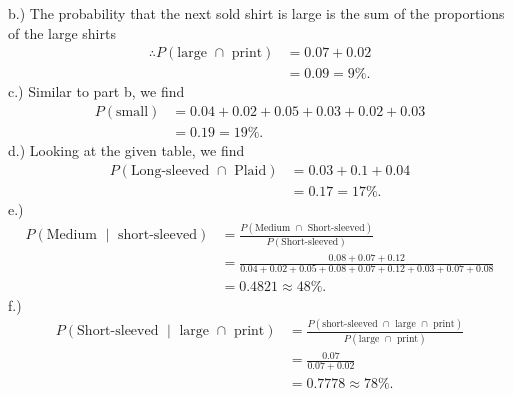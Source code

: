 \documentclass{report}
\begin{document}
    \bigbreak \noindent 
    b.) The probability that the next sold shirt is large is the sum of the proportions of the large shirts
    \begin{align*}
        \therefore P(\text{large } \cap \text{ print}) &= 0.07 + 0.02 \\
        &=0.09 = 9\%
    .\end{align*}
    \bigbreak \noindent 
    c.) Similar to part b, we find
    \begin{align*}
        P(\text{small}) &= 0.04 + 0.02 + 0.05 + 0.03 + 0.02 + 0.03 \\
                        &=0.19 = 19\%
    .\end{align*}
    \bigbreak \noindent 
    d.) Looking at the given table, we find
    \begin{align*}
        P(\text{Long-sleeved } \cap \text{ Plaid}) &= 0.03 + 0.1 + 0.04 \\
        &=0.17 = 17\%
    .\end{align*}
    \bigbreak \noindent 
    e.) 
    \begin{align*}
        P(\text{Medium } \mid \text{ short-sleeved}) &= \frac{P(\text{Medium } \cap \text{ Short-sleeved})}{P(\text{Short-sleeved})} \\
                                                     &=\frac{0.08 + 0.07 + 0.12}{0.04 + 0.02 + 0.05 + 0.08 + 0.07 + 0.12 + 0.03 + 0.07 + 0.08} \\
                                                     &=0.4821 \approx  48\%
    .\end{align*}
    \bigbreak \noindent 
    f.) 
    \begin{align*}
        P(\text{Short-sleeved } \mid \text{ large } \cap \text{ print}) &= \frac{P(\text{short-sleeved } \cap \text{ large } \cap \text{ print})}{P(\text{large } \cap \text{ print})} \\
                                                                        &=\frac{0.07}{0.07 + 0.02} \\
                                                                        &=0.7778 \approx 78\%
    .\end{align*}
\end{document}

